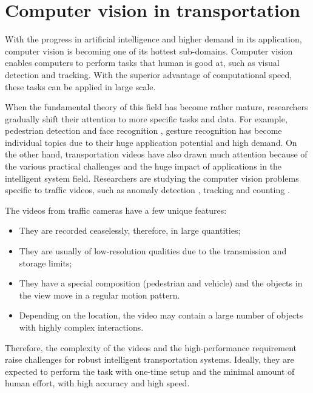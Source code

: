 \section{Computer vision in transportation}
\label{sec:intro-cv}

With the progress in artificial intelligence and higher demand in its application, computer vision is becoming one of its hottest sub-domains. 
Computer vision enables computers to perform tasks that human is good at, such as visual detection and tracking. 
With the superior advantage of computational speed, these tasks can be applied in large scale.

When the fundamental theory of this field has become rather mature, researchers gradually shift their attention to more specific tasks and data. For example, pedestrian detection \cite{dollar2012pedestrian} and face recognition \cite{parkhi2015deep}, gesture recognition \cite{rautaray2015vision} has become individual topics due to their huge application potential and high demand.
On the other hand, transportation videos have also drawn much attention because of the various practical challenges and the huge impact of applications in the intelligent system field. 
Researchers are studying the computer vision problems specific to traffic videos, such as anomaly detection \cite{scime2018anomaly}, tracking \cite{wu2015object} and counting \cite{seenouvong2016computer}. 


The videos from traffic cameras have a few unique features: 
\begin{itemize}
\item They are recorded ceaselessly, therefore, in large quantities; 
\item They are usually of low-resolution qualities due to the transmission and storage limits;
\item They have a special composition (pedestrian and vehicle) and the objects in the view move in a regular motion pattern.
\item Depending on the location, the video may contain a large number of objects with highly complex interactions.
\end{itemize}

Therefore, the complexity of the videos and the high-performance requirement raise challenges for robust intelligent transportation systems. 
Ideally, they are expected to perform the task with one-time setup and the minimal amount of human effort, with high accuracy and high speed.